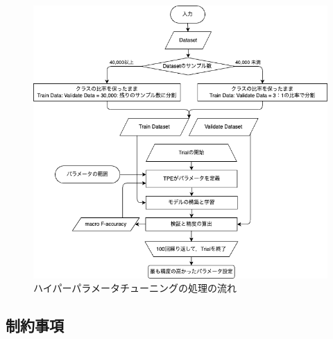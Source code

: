 \begin{figure}
    \centering
    \includegraphics[width=15cm]{figures/optuna.png}
        \caption{ハイパーパラメータチューニングの処理の流れ}
        \label{fig:hyperparameter-tuning}
\end{figure}



\subsection{制約事項}